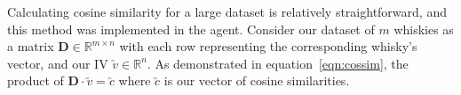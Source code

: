 Calculating cosine similarity for a large dataset is relatively straightforward,
and this method was implemented in the agent. Consider our dataset of $m$ 
whiskies as a matrix $\textbf{D} \in \mathbb{R}^{m \times n}$ with each row representing
the corresponding whisky's vector, and our IV $\utilde{v} \in \mathbb{R}^{n}$.
As demonstrated in equation~\ref{eqn:cossim}, the product of 
$\textbf{D} \cdot \utilde{v} = \utilde{c}$ where $\utilde{c}$ is our vector 
of cosine similarities.